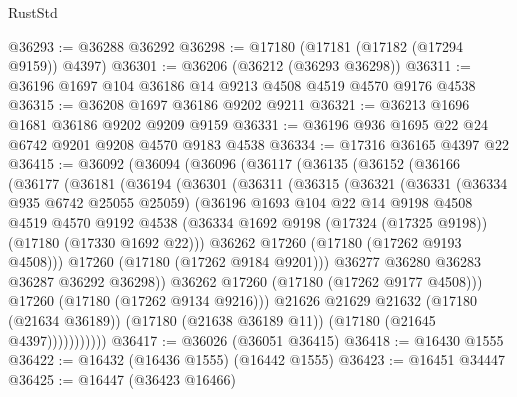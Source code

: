 \begin{lexlean}{RustStd}
\begin{coremodule}
@36293 := @36288 @36292
@36298 := @17180 (@17181 (@17182 (@17294 @9159)) @4397)
@36301 := @36206 (@36212 (@36293 @36298))
@36311 := @36196 @1697 @104 @36186 @14 @9213 @4508 @4519 @4570 @9176 @4538
@36315 := @36208 @1697 @36186 @9202 @9211
@36321 := @36213 @1696 @1681 @36186 @9202 @9209 @9159
@36331 := @36196 @936 @1695 @22 @24 @6742 @9201 @9208 @4570 @9183 @4538
@36334 := @17316 @36165 @4397 @22
@36415 := @36092
    (@36094
      (@36096
        (@36117
          (@36135
            (@36152
              (@36166
                (@36177
                  (@36181
                    (@36194
                      (@36301
                        (@36311
                          (@36315
                            (@36321
                              (@36331
                                (@36334 @935 @6742 @25055 @25059)
                                (@36196
                                  @1693
                                  @104
                                  @22
                                  @14
                                  @9198
                                  @4508
                                  @4519
                                  @4570
                                  @9192
                                  @4538
                                  (@36334
                                    @1692
                                    @9198
                                    (@17324 (@17325 @9198))
                                    (@17180 (@17330 @1692 @22)))
                                  @36262
                                  @17260
                                  (@17180 (@17262 @9193 @4508)))
                                @17260
                                (@17180 (@17262 @9184 @9201)))
                              @36277
                              @36280
                              @36283
                              @36287
                              @36292
                              @36298))
                          @36262
                          @17260
                          (@17180 (@17262 @9177 @4508)))
                        @17260
                        (@17180 (@17262 @9134 @9216)))
                      @21626
                      @21629
                      @21632
                      (@17180 (@21634 @36189))
                      (@17180 (@21638 @36189 @11))
                      (@17180 (@21645 @4397)))))))))))
@36417 := @36026 (@36051 @36415)
@36418 := @16430 @1555
@36422 := @16432 (@16436 @1555) (@16442 @1555)
@36423 := @16451 @34447
@36425 := @16447 (@36423 @16466)

\end{coremodule}
\end{lexlean}
